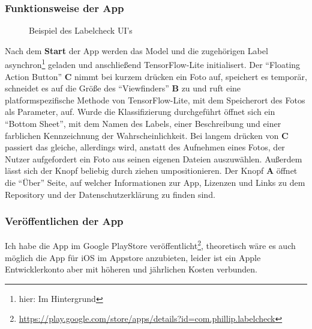 \subsubsection{Funktionsweise der App}

\setlength{\belowcaptionskip}{-10pt}
\begin{wrapfigure}{r}{55mm}
  \caption[]{Beispiel des Labelcheck UI's}
  \label{screenshot}
\end{wrapfigure}
\setlength{\belowcaptionskip}{0pt}

Nach dem \textbf{Start} der App werden das Model und die zugehörigen Label asynchron\footnote{hier: Im Hintergrund} geladen und anschließend TensorFlow-Lite initialisert. Der "`Floating Action Button"' \textbf{C} nimmt bei kurzem drücken ein Foto auf, speichert es temporär, schneidet es auf die Größe des "`Viewfinders"' \textbf{B} zu und ruft eine platformspezifische Methode von TensorFlow-Lite, mit dem Speicherort des Fotos als Parameter, auf. Wurde die Klassifizierung durchgeführt öffnet sich ein "`Bottom Sheet"', mit dem Namen des Labels, einer Beschreibung und einer farblichen Kennzeichnung der Wahrscheinlichkeit. Bei langem drücken von \textbf{C} passiert das gleiche, allerdings wird, anstatt des Aufnehmen eines Fotos, der Nutzer aufgefordert ein Foto aus seinen eigenen Dateien auszuwählen. Außerdem lässt sich der Knopf beliebig durch ziehen umpositionieren. Der Knopf \textbf{A} öffnet die "`Über"' Seite, auf welcher Informationen zur App, Lizenzen und Links zu dem Repository und der Datenschutzerklärung zu finden sind.

\subsubsection{Veröffentlichen der App}

Ich habe die App im Google PlayStore veröffentlicht\footnote{\url{https://play.google.com/store/apps/details?id=com.phillip.labelcheck}}, theoretisch wäre es auch möglich die App für iOS im Appstore anzubieten, leider ist ein Apple Entwicklerkonto aber mit höheren und jährlichen Kosten verbunden.

